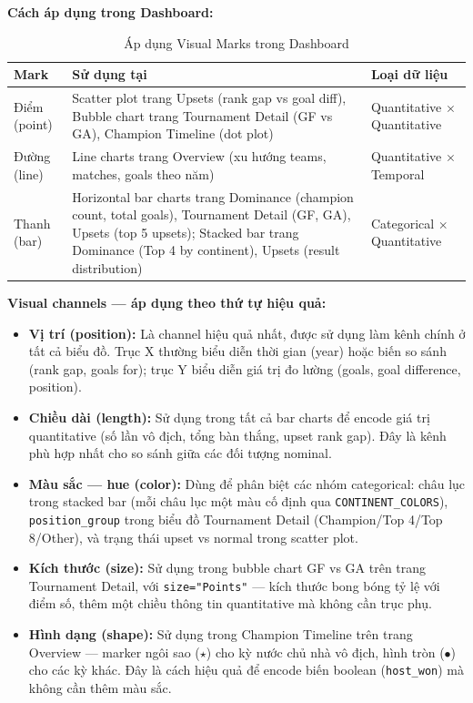 \documentclass[12pt,a4paper]{article}
\begin{document}
\textbf{Cách áp dụng trong Dashboard:}

\begin{table}[H]
\centering
\caption{Áp dụng Visual Marks trong Dashboard}
\label{tab:visual_marks}
\begin{tabular}{llp{7.5cm}}
\toprule
\textbf{Mark} & \textbf{Sử dụng tại} & \textbf{Loại dữ liệu} \\
\midrule
Điểm (point) & Scatter plot trang Upsets (rank gap vs goal diff), Bubble chart trang Tournament Detail (GF vs GA), Champion Timeline (dot plot) & Quantitative $\times$ Quantitative \\
Đường (line) & Line charts trang Overview (xu hướng teams, matches, goals theo năm) & Quantitative $\times$ Temporal \\
Thanh (bar) & Horizontal bar charts trang Dominance (champion count, total goals), Tournament Detail (GF, GA), Upsets (top 5 upsets); Stacked bar trang Dominance (Top 4 by continent), Upsets (result distribution) & Categorical $\times$ Quantitative \\
\bottomrule
\end{tabular}
\end{table}

\textbf{Visual channels --- áp dụng theo thứ tự hiệu quả:}
\begin{itemize}
    \item \textbf{Vị trí (position):} Là channel hiệu quả nhất, được sử dụng làm kênh chính ở tất cả biểu đồ. Trục X thường biểu diễn thời gian (year) hoặc biến so sánh (rank gap, goals for); trục Y biểu diễn giá trị đo lường (goals, goal difference, position).
    \item \textbf{Chiều dài (length):} Sử dụng trong tất cả bar charts để encode giá trị quantitative (số lần vô địch, tổng bàn thắng, upset rank gap). Đây là kênh phù hợp nhất cho so sánh giữa các đối tượng nominal.
    \item \textbf{Màu sắc --- hue (color):} Dùng để phân biệt các nhóm categorical: châu lục trong stacked bar (mỗi châu lục một màu cố định qua \texttt{CONTINENT\_COLORS}), \texttt{position\_group} trong biểu đồ Tournament Detail (Champion/Top 4/Top 8/Other), và trạng thái upset vs normal trong scatter plot.
    \item \textbf{Kích thước (size):} Sử dụng trong bubble chart GF vs GA trên trang Tournament Detail, với \texttt{size="Points"} --- kích thước bong bóng tỷ lệ với điểm số, thêm một chiều thông tin quantitative mà không cần trục phụ.
    \item \textbf{Hình dạng (shape):} Sử dụng trong Champion Timeline trên trang Overview --- marker ngôi sao ($\star$) cho kỳ nước chủ nhà vô địch, hình tròn ($\bullet$) cho các kỳ khác. Đây là cách hiệu quả để encode biến boolean (\texttt{host\_won}) mà không cần thêm màu sắc.
\end{itemize}
\end{document}
